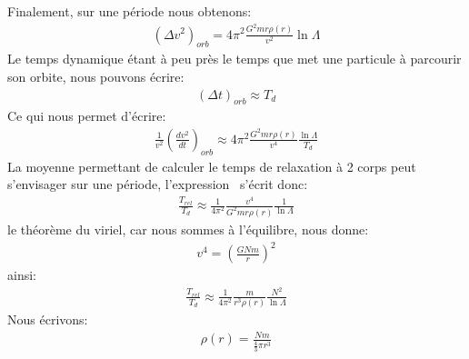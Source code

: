 Finalement, sur une période nous obtenons:
\begin{align*}
	\left(\Delta v^{2}\right)_{orb}=4\pi^{2}\frac{G^{2}mr\rho\left(r\right)}{v^{2}}\ln \Lambda
\end{align*}
Le temps dynamique étant à peu près le temps que met une particule à parcourir son orbite, nous pouvons écrire:
\begin{align*}
	\left(  \Delta t\right)  _{orb}\approx T_{d}%
\end{align*}
Ce qui nous permet d'écrire:
\begin{align*}
	\frac{1}{v^{2}}\left(\frac{dv^{2}}{dt}\right)_{orb}\approx4\pi^{2}\frac{G^{2}mr\rho\left(r\right)}{v^{4}}\frac{\ln \Lambda}{T_{d}}%
\end{align*}
La moyenne permettant de calculer le temps de relaxation à 2 corps peut s'envisager sur une période, l'expression~ s'écrit donc:
\begin{align*}
	\frac{T_{rel}}{T_{d}}\approx\frac{1}{4\pi^{2}}\frac{v^{4}}{G^{2}mr\rho\left(  r\right)  }\frac{1}{\ln \Lambda}%
\end{align*}
le théorème du viriel, car nous sommes à l'équilibre, nous donne:
\begin{align*}
	v^{4}=\left(\frac{GNm}{r}\right)^{2}%
\end{align*}
ainsi:
\begin{align*}
	\frac{T_{rel}}{T_{d}}\approx\frac{1}{4\pi^{2}}\frac{m}{r^{3}\rho\left(r\right)}\frac{N^{2}}{\ln \Lambda}
\end{align*}
Nous écrivons:
\begin{align*}
	\rho\left(r\right)=\frac{Nm}{\frac{4}{3}\pi r^{3}}%
\end{align*}
